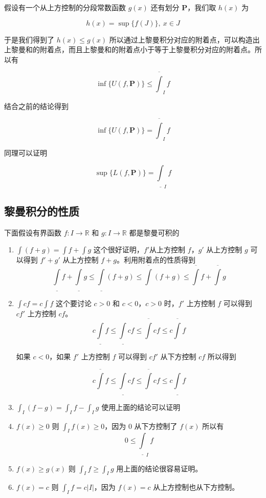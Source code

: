 假设有一个从上方控制的分段常数函数 $g(x)$ 还有划分 $\mathbf{P}$，我们取 $h(x)$ 为

\[
    h(x) = \sup \{ f(J) \}, \: x \in J
\]

于是我们得到了 $h(x) \le g(x)$ 所以通过上黎曼积分对应的附着点，可以构造出上黎曼和的附着点，而且上黎曼和的附着点小于等于上黎曼积分对应的附着点。所以有

\[
 \inf \{ U(f, \mathbf{P}) \}   \le  \overline{\int}_I f
\]

结合之前的结论得到

\[
 \inf \{ U(f, \mathbf{P}) \}  =  \overline{\int}_I f
\]

同理可以证明


\[
 \sup \{ L(f, \mathbf{P}) \}  =  \underline{\int}_I f
\]

\subsection{黎曼积分的性质}

下面假设有界函数 $f: I \to \mathbb{R}$ 和 $g: I \to \mathbb{R}$ 都是黎曼可积的

\begin{enumerate}
    \item $\int(f+g) = \int f + \int g $ 这个很好证明，$f'$从上方控制 $f$，$g'$ 从上方控制 $g$ 可以得到 $f'+g'$ 从上方控制 $f+g$。利用附着点的性质得到
    \[
  \underline{\int}f + \underline{\int}g \le \underline{\int}(f+g)  \le \overline{\int}(f+g) \le \overline{\int}f + \overline{\int}g
    \]

    \item $\int cf = c \int f$ 这个要讨论 $c > 0$ 和 $c < 0$，$c > 0$ 时，$f'$ 上方控制 $f$ 可以得到 $cf'$ 上方控制 $cf$。
    \[
  c\underline{\int}f \le  \underline{\int}cf \le \overline{\int}cf \le c \overline{\int}f 
    \]

    如果 $c < 0$，如果 $f'$ 上方控制 $f$ 可以得到 $cf'$ 从下方控制 $cf$ 所以得到

    \[
      c\overline{\int}f   \le \underline{\int}cf \le \overline{\int} cf \le c \underline{\int}f
    \]

    \item $\int_{I}(f-g) = \int_{I}f - \int_{I}g $ 使用上面的结论可以证明

    \item $f(x) \ge 0$ 则 $\int_{I} f(x) \ge 0$，因为 $0$ 从下方控制了 $f(x)$ 所以有
    \[
        0 \le \underline{\int}_{I} f
    \]

    \item $f(x) \ge g(x)$ 则 $\int_{I}f \ge \int_{I} g$ 用上面的结论很容易证明。

    \item $f(x) = c$ 则 $\int_{I}f = c \lvert I \rvert$，因为 $f(x) =c$ 从上方控制也从下方控制。


\end{enumerate}